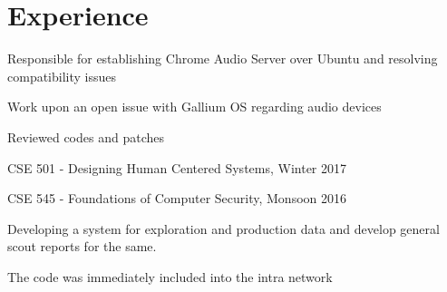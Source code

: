 \documentclass[letterpaper]{deedy-resume} %
\begin{document}
				 \begin{minipage}[t]{0.66\textwidth} %


				 \section{Experience}


				 \vspace{\topsep} %
				 \begin{tightitemize}
				 \item Responsible for establishing Chrome Audio Server over Ubuntu and resolving compatibility issues
				 \item Work upon an open issue with Gallium OS regarding audio devices
				 \item Reviewed codes and patches
				 \end{tightitemize}

				 \sectionspace %



				 \begin{tightitemize}
				 \item CSE 501 - Designing Human Centered Systems, Winter 2017 
				 \item CSE 545 - Foundations of Computer Security, Monsoon 2016
				 \end{tightitemize}

				 \sectionspace %



				 \begin{tightitemize}
				 \item Developing a system for exploration and production data and
				 develop general scout reports for the same.
				 \item The code was immediately included into the intra network
				 \end{tightitemize}


\end{minipage}
\end{document}
